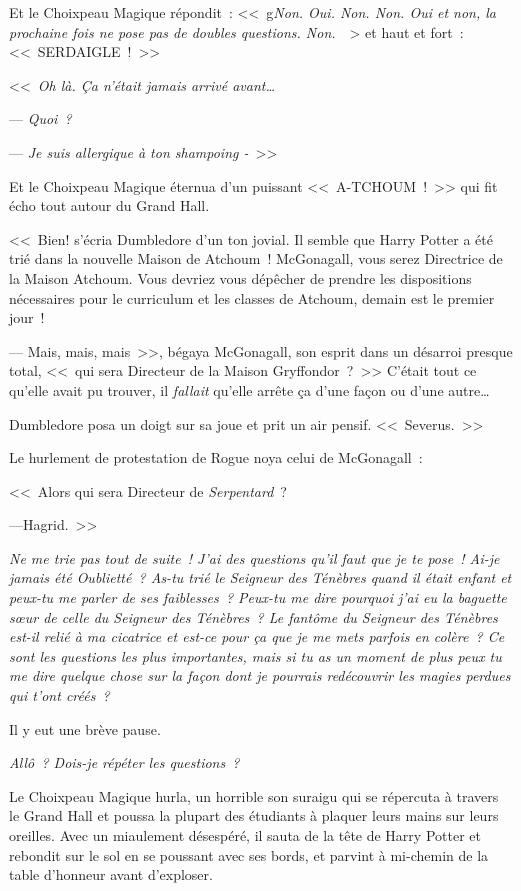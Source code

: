 {Et le Choixpeau Magique répondit~: <<~g\emph{Non. Oui. Non. Non. Oui et non, la prochaine fois ne pose pas de doubles questions. Non.}~~> et haut et fort~: <<~SERDAIGLE~!~>>

\later

<<~\emph{Oh là. Ça n'était jamais arrivé avant…}

--- \emph{Quoi~?}

--- \emph{Je suis allergique à ton shampoing -}~>>

Et le Choixpeau Magique éternua d'un puissant <<~A-TCHOUM~!~>> qui fit écho tout autour du Grand Hall.

<<~Bien! s'écria Dumbledore d'un ton jovial. Il semble que Harry Potter a été trié dans la nouvelle Maison de Atchoum~! McGonagall, vous serez Directrice de la Maison Atchoum. Vous devriez vous dépêcher de prendre les dispositions nécessaires pour le curriculum et les classes de Atchoum, demain est le premier jour~!

--- Mais, mais, mais~>>, bégaya McGonagall, son esprit dans un désarroi presque total, <<~qui sera Directeur de la Maison Gryffondor~?~>> C'était tout ce qu'elle avait pu trouver, il \emph{fallait} qu'elle arrête ça d'une façon ou d'une autre…

Dumbledore posa un doigt sur sa joue et prit un air pensif. <<~Severus.~>>

Le hurlement de protestation de Rogue noya celui de McGonagall~:

<<~Alors qui sera Directeur de \emph{Serpentard}~?

---Hagrid.~>>

\later

\emph{Ne me trie pas tout de suite~! J'ai des questions qu'il faut que je te pose~! Ai-je jamais été Oublietté~? As-tu trié le Seigneur des Ténèbres quand il était enfant et peux-tu me parler de ses faiblesses~? Peux-tu me dire pourquoi j'ai eu la baguette sœur de celle du Seigneur des Ténèbres~? Le fantôme du Seigneur des Ténèbres est-il relié à ma cicatrice et est-ce pour ça que je me mets parfois en colère~? Ce sont les questions les plus importantes, mais si tu as un moment de plus peux tu me dire quelque chose sur la façon dont je pourrais redécouvrir les magies perdues qui t'ont créés~?}

Il y eut une brève pause.

\emph{Allô~? Dois-je répéter les questions~?}

Le Choixpeau Magique hurla, un horrible son suraigu qui se répercuta à travers le Grand Hall et poussa la plupart des étudiants à plaquer leurs mains sur leurs oreilles. Avec un miaulement désespéré, il sauta de la tête de Harry Potter et rebondit sur le sol en se poussant avec ses bords, et parvint à mi-chemin de la table d'honneur avant d'exploser.

}
